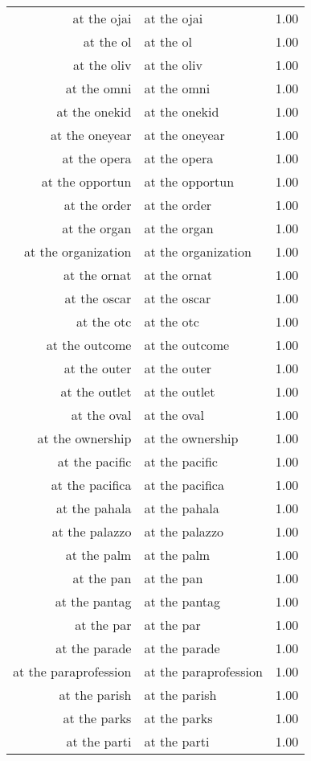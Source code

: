 \begin{table}[ht]
\begin{tabular}{rlr}
  at the ojai & at the ojai & 1.00 \\ 
  at the ol & at the ol & 1.00 \\ 
  at the oliv & at the oliv & 1.00 \\ 
  at the omni & at the omni & 1.00 \\ 
  at the onekid & at the onekid & 1.00 \\ 
  at the oneyear & at the oneyear & 1.00 \\ 
  at the opera & at the opera & 1.00 \\ 
  at the opportun & at the opportun & 1.00 \\ 
  at the order & at the order & 1.00 \\ 
  at the organ & at the organ & 1.00 \\ 
  at the organization & at the organization & 1.00 \\ 
  at the ornat & at the ornat & 1.00 \\ 
  at the oscar & at the oscar & 1.00 \\ 
  at the otc & at the otc & 1.00 \\ 
  at the outcome & at the outcome & 1.00 \\ 
  at the outer & at the outer & 1.00 \\ 
  at the outlet & at the outlet & 1.00 \\ 
  at the oval & at the oval & 1.00 \\ 
  at the ownership & at the ownership & 1.00 \\ 
  at the pacific & at the pacific & 1.00 \\ 
  at the pacifica & at the pacifica & 1.00 \\ 
  at the pahala & at the pahala & 1.00 \\ 
  at the palazzo & at the palazzo & 1.00 \\ 
  at the palm & at the palm & 1.00 \\ 
  at the pan & at the pan & 1.00 \\ 
  at the pantag & at the pantag & 1.00 \\ 
  at the par & at the par & 1.00 \\ 
  at the parade & at the parade & 1.00 \\ 
  at the paraprofession & at the paraprofession & 1.00 \\ 
  at the parish & at the parish & 1.00 \\ 
  at the parks & at the parks & 1.00 \\ 
  at the parti & at the parti & 1.00 \\ 

\end{tabular}
\end{table}
